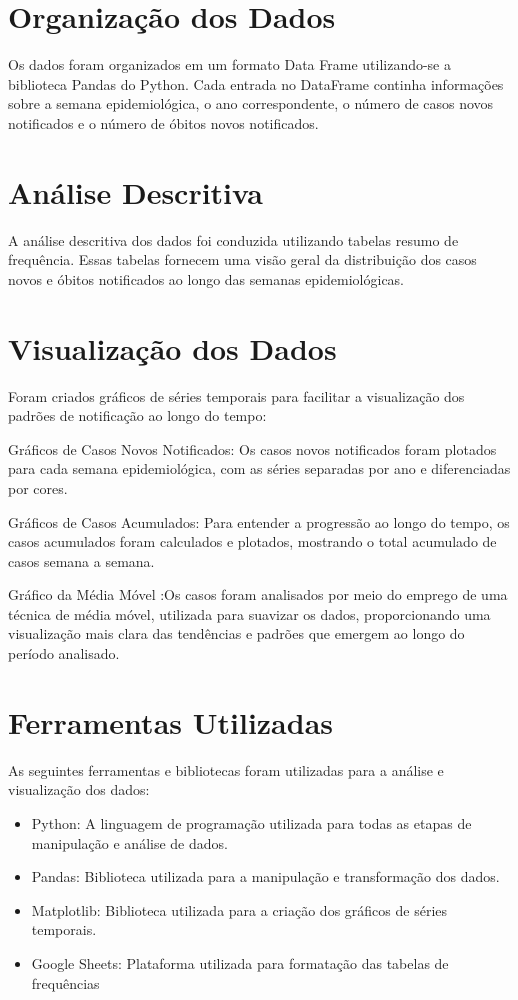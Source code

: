\documentclass[a4paper,12pt]{report}
\begin{document}
\section*{Organização dos Dados}
Os dados foram organizados em um formato Data Frame utilizando-se a biblioteca Pandas do Python. Cada entrada no DataFrame continha informações sobre a semana epidemiológica, o ano correspondente, o número de casos novos notificados e o número de óbitos novos notificados.

\section*{Análise Descritiva}
A análise descritiva dos dados foi conduzida utilizando tabelas resumo de frequência. Essas tabelas fornecem uma visão geral da distribuição dos casos novos e óbitos notificados ao longo das semanas epidemiológicas.

\section*{Visualização dos Dados}
Foram criados gráficos de séries temporais para facilitar a visualização dos padrões de notificação ao longo do tempo:

Gráficos de Casos Novos Notificados: Os casos novos notificados foram plotados para cada semana epidemiológica, com as séries separadas por ano e diferenciadas por cores.

Gráficos de Casos Acumulados: Para entender a progressão ao longo do tempo, os casos acumulados foram calculados e plotados, mostrando o total acumulado de casos semana a semana.

Gráfico da Média Móvel :Os casos foram analisados por meio do emprego de uma técnica de média móvel, utilizada para suavizar os dados, proporcionando uma visualização mais clara das tendências e padrões que emergem ao longo do período analisado.

\section*{Ferramentas Utilizadas}
As seguintes ferramentas e bibliotecas foram utilizadas para a análise e visualização dos dados:

\begin{itemize}
    \item Python: A linguagem de programação utilizada para todas as etapas de manipulação e análise de dados.

    \item Pandas: Biblioteca utilizada para a manipulação e transformação dos dados.

    \item Matplotlib: Biblioteca utilizada para a criação dos gráficos de séries temporais.

    \item Google Sheets: Plataforma utilizada para formatação das tabelas de frequências
\end{itemize}
\end{document}
